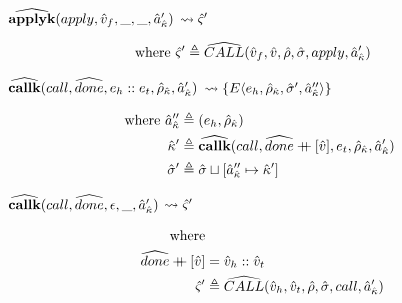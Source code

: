 \documentclass[12pt,draft]{article}
\newcommand\mdoubleplus{\ensuremath{\mathbin{+\mkern-9mu+}}}
\newcommand{\E}[4]{E\langle #1 , #2 , #3 , #4 \rangle}
\begin{document}
\begin{multicols*}{2}
\begin{center}
    $\widehat{\textbf{applyk}}(apply , \hat{v}_f , \_ , \_ , \hat{a}_{\hat{\kappa}}')$
    $\leadsto \hat{\varsigma}'$
  \end{center}
  \vspace{-7mm}
  \begin{align*}
    \text{where }
    \hat{\varsigma}' &\triangleq \widehat{CALL}(\hat{v}_f , \hat{v} , \hat{\rho} , \hat{\sigma},apply,\hat{a}_{\hat{\kappa}}')
  \end{align*}
  \begin{center}
    $\widehat{\textbf{callk}}(call , \widehat{done} , e_h :: e_t , \hat{\rho}_{\hat{\kappa}} , \hat{a}_{\hat{\kappa}}')$
    $\leadsto \{ \E{e_h}{\aenv_{\akont}}{\astore'}{\akaddr''} \}$
  \end{center}
  \vspace{-7mm}
  \begin{align*}
    \text{where }
    \akaddr'' &\triangleq (e_h , \aenv_{\akont}) \\
    \akont' &\triangleq \acallk{call}{\adone \mdoubleplus [\aval]}{e_t}{\aenv_{\akont}}{\akaddr'} \\
    \astore' &\triangleq \astore \sqcup [\akaddr'' \mapsto \akont']
  \end{align*}
  \begin{center}
    $\widehat{\textbf{callk}}(call , \widehat{done} , \epsilon , \_ , \hat{a}_{\hat{\kappa}}')$
    $\leadsto \hat{\varsigma}'$
  \end{center}
  \vspace{-7mm}
  \begin{align*}
    \text{where}& \\\
    \adone \mdoubleplus [\aval] &= \aval_h :: \aval_t \\
    \astate' &\triangleq \aCALL(\aval_h , \aval_t ,
               \aenv , \astore , call , \akaddr')
  \end{align*}
\end{multicols*}
\end{document}
